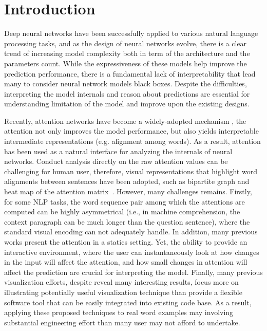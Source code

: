\section{Introduction}

Deep neural networks have been successfully applied to various natural language processing tasks,
and as the design of neural networks evolve, there is a clear trend of increasing model complexity both in term of the architecture and the parameters count. 
%
While the expressiveness of these models help improve the prediction performance, there is a fundamental lack of interpretability that lead many to consider neural network models black boxes. 
%
Despite the difficulties, interpreting the model internals and reason about predictions are essential for understanding limitation of the model and improve upon the existing designs.


Recently, attention networks have become a widely-adopted mechanism \cite{VaswaniShazeerParmar2017, Parikh2016}, the attention not only improves the model performance, but also yields interpretable intermediate representations (e.g. alignment among words). As a result, attention has been used as a natural interface for analyzing the internals of neural networks. Conduct analysis directly on the raw attention values can be challenging for human user, therefore, visual representations that highlight word alignments between sentences have been adopted, such as bipartite graph and heat map of the attention matrix~\cite{LiChenHovy2015, li2016understanding, lee2017interactive}.  However, many challenges remains. Firstly, for some NLP tasks, the word sequence pair among which the attentions are computed can be highly asymmetrical (i.e., in machine comprehension, the context paragraph can be much longer than the question sentence), where the standard visual encoding can not adequately handle.  In addition, many previous works present the attention in a statics setting. Yet, the ability to provide an interactive environment, where the user can instantaneously look at how changes in the input will affect the attention, and how small changes in attention will affect the prediction are crucial for interpreting the model. Finally, many previous visualization efforts, despite reveal many interesting results, focus more on illustrating potentially useful visualization technique than provide a flexible software tool that can be easily integrated into existing code base. As a result, applying these proposed techniques to real word examples may involving substantial engineering effort than many user may not afford to undertake.


